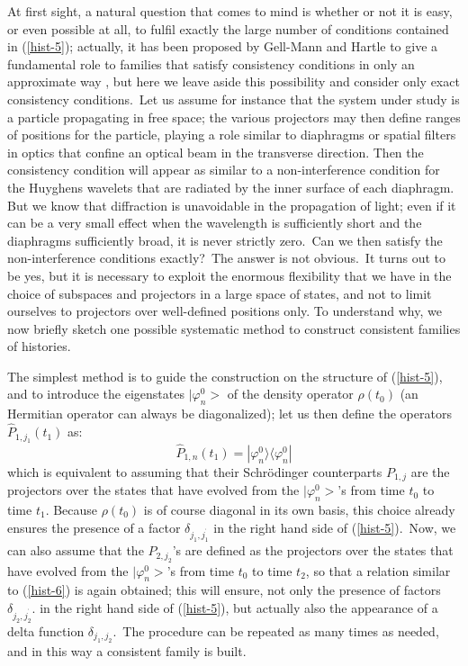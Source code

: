 \documentclass[12pt,onecolumn]{article}%
\begin{document}
At first sight, a natural question that comes to mind is whether or not it is
easy, or even possible at all, to fulfil exactly the large number of
conditions contained in (\ref{hist-5}); actually, it has been proposed by
Gell-Mann and Hartle to give a fundamental role to families that satisfy
consistency conditions in only an approximate way \cite{Gell-Mann}, but here
we leave aside this possibility and consider only exact consistency
conditions.\ Let us assume for instance that the system under study is a
particle propagating in free space; the various projectors may then define
ranges of positions for the particle, playing a role similar to diaphragms or
spatial filters in optics that confine an optical beam in the transverse
direction. Then the consistency condition will appear as similar to a
non-interference condition for the Huyghens wavelets that are radiated by the
inner surface of each diaphragm. But we know that diffraction is unavoidable
in the propagation of light; even if it can be a very small effect when the
wavelength is sufficiently short and the diaphragms sufficiently broad, it is
never strictly zero.\ Can we then satisfy the non-interference conditions
exactly?\ The answer is not obvious.\ It turns out to be yes, but it is
necessary to exploit the enormous flexibility that we have in the choice of
subspaces and projectors in a large space of states, and not to limit
ourselves to projectors over well-defined positions only. To understand why,
we now briefly sketch one possible systematic method to construct consistent
families of histories.

The simplest method is to guide the construction on the structure of
(\ref{hist-5}), and to introduce the eigenstates $|\varphi_{n}^{0}>$ of the
density operator $\rho(t_{0})$ (an Hermitian operator can always be
diagonalized); let us then define the operators $\widehat{P}_{1,j_{1}}(t_{1})$
as:%
\begin{equation}
\widehat{P}_{1,n}(t_{1})=|\varphi_{n}^{0}\rangle \langle\varphi_{n}^{0}|
\label{hist-6}%
\end{equation}
which is equivalent to assuming that their Schr\"{o}dinger counterparts
$P_{1,j}$ are the projectors over the states that have evolved from the
$|\varphi_{n}^{0}>$'s from time $t_{0}$ to time $t_{1}$. Because
$\rho(t_{0})$ is of course diagonal in its own basis, this choice already
ensures the presence of a factor $\delta_{j_{1},j_{1}^{^{\prime}}}$ in the
right hand side of (\ref{hist-5}).\ Now, we can also assume that the
$P_{2,j_{2}}$'s are defined as the projectors over the states that have
evolved from the $|\varphi_{n}^{0}>$'s from time $t_{0}$ to time $t_{2}$,
so that a relation similar to (\ref{hist-6}) is again obtained; this will
ensure, not only the presence of factors $\delta_{j_{2},j_{2}^{^{\prime}}}$.
in the right hand side of (\ref{hist-5}), but actually also the appearance of
a delta function $\delta_{j_{1},j_{2}}$.\ The procedure can be repeated as
many times as needed, and in this way a consistent family is built.
\end{document}
